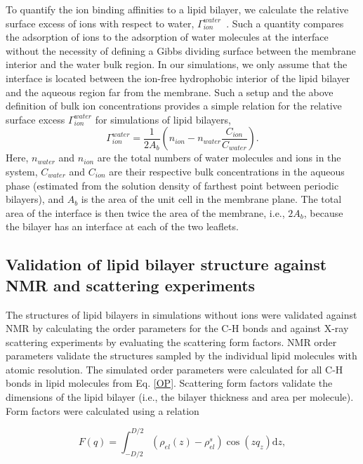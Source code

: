 \documentclass[journal=jpcbfk,manuscript=article]{achemso}
\begin{document}
To quantify the ion binding affinities to a lipid bilayer, we calculate the relative surface excess of ions with respect to water, $\Gamma_{ion}^{water}$~\cite{chattorajBOOK}. Such a quantity compares the adsorption of ions to the adsorption of water molecules at the interface without the necessity of defining a Gibbs dividing surface between the membrane interior and the water bulk region. In our simulations, we only assume that the interface is located between the ion-free hydrophobic interior of the lipid bilayer and the aqueous region far from the membrane.  Such a setup and the above definition of bulk ion concentrations provides a simple relation for the relative surface excess $\Gamma_{ion}^{water}$ for simulations of lipid bilayers,
 \begin{equation}\label{surfexcess}
  \Gamma_{ion}^{water}=\frac{1}{2A_b} \left ( n_{ion} - n_{water} \frac{C_{ion}}{C_{water}} \right ).
\end{equation}
Here, $n_{water}$ and $n_{ion}$ are the total numbers of water molecules and ions in the system,
$C_{water}$ and $C_{ion}$ are their respective bulk concentrations in the aqueous phase
(estimated from the solution density of farthest point between periodic bilayers),
and $A_b$ is the area of the unit cell in the membrane plane.
The total area of the interface is then twice the area of the membrane, i.e., $2A_b$,
because the bilayer has an interface at each of the two leaflets.



\subsection{Validation of lipid bilayer structure against NMR and scattering experiments}
The structures of lipid bilayers in simulations without ions were validated against NMR by calculating the order parameters for the C-H bonds and against \mbox{X-ray} scattering experiments by evaluating the scattering form factors. NMR order parameters validate the structures sampled by the individual lipid molecules with atomic resolution. The simulated order parameters were calculated for all C-H bonds in lipid molecules from Eq. \ref{OP}. Scattering form factors validate the dimensions of the lipid bilayer (i.e., the bilayer thickness and area per molecule). Form factors were calculated using a relation

\begin{equation}
  F(q) = \int _{-D/2} ^{D/2} \left ( \rho_{el}(z) - \rho_{el}^s \right ) \cos (zq_z) \mathrm{d}z,
\end{equation}
\end{document}
